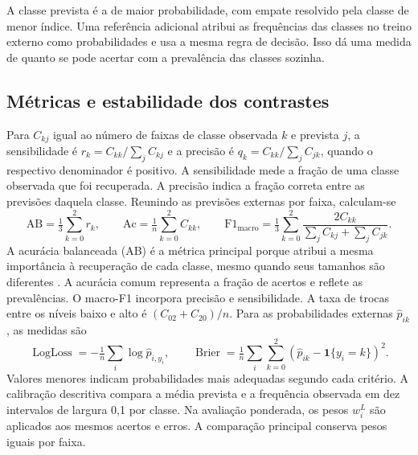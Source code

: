 A classe prevista é a de maior probabilidade, com empate resolvido pela classe de menor índice. Uma referência adicional atribui as frequências das classes no treino externo como probabilidades e usa a mesma regra de decisão. Isso dá uma medida de quanto se pode acertar com a prevalência das classes sozinha.

\subsection{Métricas e estabilidade dos contrastes}
Para $C_{kj}$ igual ao número de faixas de classe observada $k$ e prevista $j$, a sensibilidade é $r_k=C_{kk}/\sum_j C_{kj}$ e a precisão é $q_k=C_{kk}/\sum_j C_{jk}$, quando o respectivo denominador é positivo. A sensibilidade mede a fração de uma classe observada que foi recuperada. A precisão indica a fração correta entre as previsões daquela classe. Reunindo as previsões externas por faixa, calculam-se
\begin{equation}
\mathrm{AB}=\tfrac13\sum_{k=0}^{2}r_k,\qquad
\mathrm{Ac}=\tfrac1n\sum_{k=0}^2 C_{kk},\qquad
\mathrm{F1}_{\mathrm{macro}}=\tfrac13\sum_{k=0}^2\frac{2C_{kk}}{\sum_j C_{kj}+\sum_j C_{jk}}.
\end{equation}
A acurácia balanceada (AB) é a métrica principal porque atribui a mesma importância à recuperação de cada classe, mesmo quando seus tamanhos são diferentes \cite{brodersen2010}. A acurácia comum representa a fração de acertos e reflete as prevalências. O macro-F1 incorpora precisão e sensibilidade. A taxa de trocas entre os níveis baixo e alto é $(C_{02}+C_{20})/n$. Para as probabilidades externas $\widehat p_{ik}$, as medidas são \cite{gneiting2007}
\begin{equation}
\operatorname{LogLoss}=-\tfrac1n\sum_i\log\widehat p_{i,y_i},
\qquad
\operatorname{Brier}=\tfrac1n\sum_i\sum_{k=0}^2(\widehat p_{ik}-\mathbf{1}\{y_i=k\})^2.
\end{equation}
Valores menores indicam probabilidades mais adequadas segundo cada critério. A calibração descritiva compara a média prevista e a frequência observada em dez intervalos de largura 0,1 por classe. Na avaliação ponderada, os pesos $w_i^L$ são aplicados aos mesmos acertos e erros. A comparação principal conserva pesos iguais por faixa.

